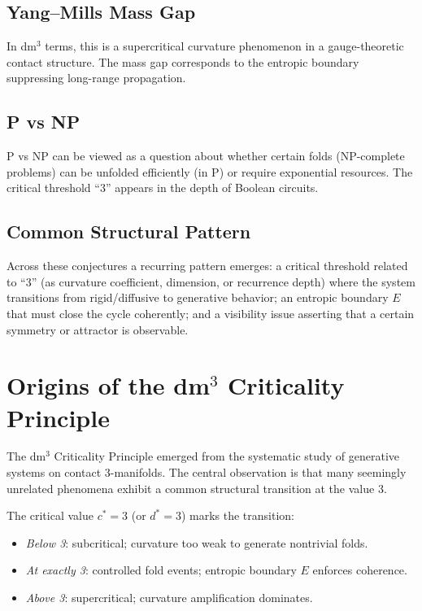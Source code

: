 \documentclass[11pt,a4paper]{article}
\theoremstyle{definition}
\theoremstyle{remark}
\begin{document}
\subsection{Yang--Mills Mass Gap}

In dm$^3$ terms, this is a supercritical curvature phenomenon in a gauge-theoretic contact
structure. The mass gap corresponds to the entropic boundary suppressing long-range propagation.

\subsection{P vs NP}

P vs NP can be viewed as a question about whether certain folds (NP-complete problems) can be
unfolded efficiently (in P) or require exponential resources. The critical threshold ``3''
appears in the depth of Boolean circuits.

\subsection{Common Structural Pattern}

Across these conjectures a recurring pattern emerges: a critical threshold related to ``3'' (as
curvature coefficient, dimension, or recurrence depth) where the system transitions from
rigid/diffusive to generative behavior; an entropic boundary $E$ that must close the cycle
coherently; and a visibility issue asserting that a certain symmetry or attractor is observable.

\section{Origins of the dm\texorpdfstring{$^3$}{3} Criticality Principle}

The dm$^3$ Criticality Principle emerged from the systematic study of generative systems on
contact 3-manifolds. The central observation is that many seemingly unrelated phenomena exhibit
a common structural transition at the value 3.

The critical value $c^*=3$ (or $d^*=3$) marks the transition:
\begin{itemize}
  \item \textit{Below 3}: subcritical; curvature too weak to generate nontrivial folds.
  \item \textit{At exactly 3}: controlled fold events; entropic boundary $E$ enforces coherence.
  \item \textit{Above 3}: supercritical; curvature amplification dominates.
\end{itemize}
\end{document}

